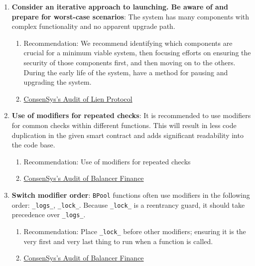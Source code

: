 \begin{enumerate}
\item\textbf{Consider an iterative approach to launching. Be aware of and prepare for worst-case scenarios}: The system has many components with complex functionality and no apparent upgrade path.
	\begin{enumerate}
	\item Recommendation: We recommend identifying which components are crucial for a minimum viable system, then focusing efforts on ensuring the security of those components first, and then moving on to the others. During the early life of the system, have a method for pausing and upgrading the system.
	\item\href{https://consensys.net/diligence/audits/2020/05/lien-protocol/\#consider-an-iterative-approach-to-launching}{ConsenSys's Audit of Lien Protocol}
	\end{enumerate}

\item\textbf{Use of modifiers for repeated checks}: It is recommended to use modifiers for common checks within different functions. This will result in less code duplication in the given smart contract and adds significant readability into the code base.
	\begin{enumerate}
	\item Recommendation: Use of modifiers for repeated checks
	\item\href{https://consensys.net/diligence/audits/2020/05/balancer-finance/\#use-of-modifiers-for-repeated-checks}{ConsenSys's Audit of Balancer Finance}
	\end{enumerate}

\item\textbf{Switch modifier order}: \verb|BPool| functions often use modifiers in the following order: \verb|_logs_|, \verb|_lock_|. Because \verb|_lock_| is a reentrancy guard, it should take precedence over \verb|_logs_|.
	\begin{enumerate}
	\item Recommendation: Place \verb|_lock_| before other modifiers; ensuring it is the very first and very last thing to run when a function is called.
	\item\href{https://consensys.net/diligence/audits/2020/05/balancer-finance/\#switch-modifier-order-in-bpool}{ConsenSys's Audit of Balancer Finance}
	\end{enumerate}


\end{enumerate}
